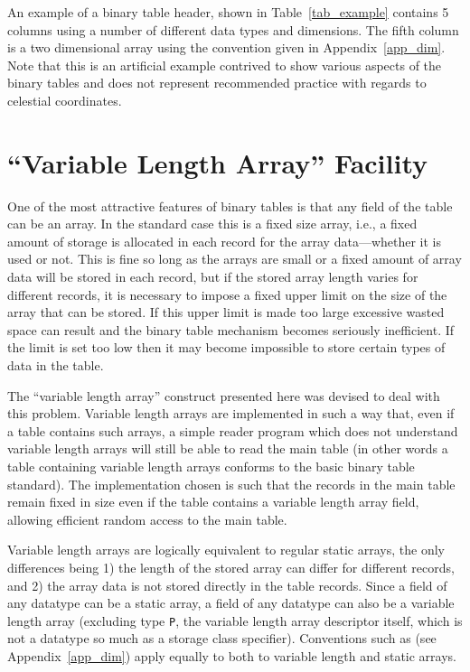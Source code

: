 An example of a binary table header, shown in Table~\ref{tab_example}
contains 5 columns using a number of different data types and
dimensions.  The fifth column is a two dimensional array using the
convention given in Appendix~\ref{app_dim}. Note that this is an
artificial example contrived to show various aspects of the binary
tables and does not represent recommended practice with regards to
celestial coordinates.

\appendix

\section{``Variable Length Array'' Facility}\label{app_varlen}

    One of the most attractive features of binary tables is that any
field of the table can be an array.  In the standard case this is a
fixed size array, i.e., a fixed amount of storage is allocated in each
record for the array data---whether it is used or not.  This is fine
so long as the arrays are small or a fixed amount of array data will
be stored in each record, but if the stored array length varies for
different records, it is necessary to impose a fixed upper limit on
the size of the array that can be stored.  If this upper limit is made
too large excessive wasted space can result and the binary table
mechanism becomes seriously inefficient.  If the limit is set too low
then it may become impossible to store certain types of data in the
table.

The ``variable length array'' construct presented here was devised to
deal with this problem.  Variable length arrays are implemented in
such a way that, even if a table contains such arrays, a simple reader
program which does not understand variable length arrays will still be
able to read the main table (in other words a table containing
variable length arrays conforms to the basic binary table standard).
The implementation chosen is such that the records in the main table
remain fixed in size even if the table contains a variable length
array field, allowing efficient random access to the main table.

Variable length arrays are logically equivalent to regular static
arrays, the only differences being 1) the length of the stored array
can differ for different records, and 2) the array data is not stored
directly in the table records.  Since a field of any datatype can be a
static array, a field of any datatype can also be a variable length
array (excluding type \verb|P|, the variable length array descriptor
itself, which is not a datatype so much as a storage class specifier).
Conventions such as  (see Appendix~\ref{app_dim})
apply equally to both to variable length and static arrays.

